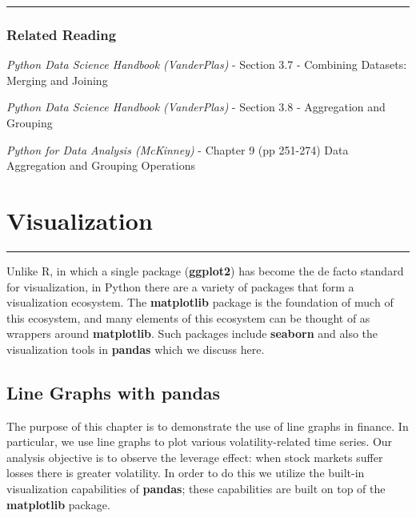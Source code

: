 \documentclass[
  letterpaper,
  DIV=11,
  numbers=noendperiod]{scrreprt}
\begin{document}
\begin{center}\rule{0.5\linewidth}{0.5pt}\end{center}

\hypertarget{related-reading-6}{%
\section{Related Reading}\label{related-reading-6}}

\emph{Python Data Science Handbook (VanderPlas)} - Section 3.7 -
Combining Datasets: Merging and Joining

\emph{Python Data Science Handbook (VanderPlas)} - Section 3.8 -
Aggregation and Grouping

\emph{Python for Data Analysis (McKinney)} - Chapter 9 (pp 251-274) Data
Aggregation and Grouping Operations

\part{Visualization}

\begin{center}\rule{0.5\linewidth}{0.5pt}\end{center}

Unlike R, in which a single package (\textbf{ggplot2}) has become the de
facto standard for visualization, in Python there are a variety of
packages that form a visualization ecosystem. The \textbf{matplotlib}
package is the foundation of much of this ecosystem, and many elements
of this ecosystem can be thought of as wrappers around
\textbf{matplotlib}. Such packages include \textbf{seaborn} and also the
visualization tools in \textbf{pandas} which we discuss here.

\hypertarget{line-graphs-with-pandas}{%
\chapter{\texorpdfstring{Line Graphs with
\textbf{pandas}}{Line Graphs with pandas}}\label{line-graphs-with-pandas}}

The purpose of this chapter is to demonstrate the use of line graphs in
finance. In particular, we use line graphs to plot various
volatility-related time series. Our analysis objective is to observe the
leverage effect: when stock markets suffer losses there is greater
volatility. In order to do this we utilize the built-in visualization
capabilities of \textbf{pandas}; these capabilities are built on top of
the \textbf{matplotlib} package.
\end{document}
